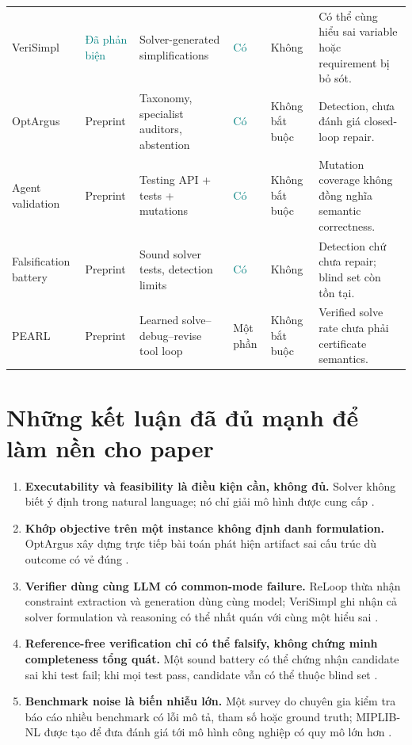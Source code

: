 \documentclass[11pt,a4paper]{article}
\newcommand{\yes}{\textcolor{teal}{Có}}
\newcommand{\partialyes}{\textcolor{gold!85!black}{Một phần}}
\newcommand{\preprint}{\textcolor{gold!80!black}{Preprint}}
\newcommand{\peer}{\textcolor{teal}{Đã phản biện}}
\begin{document}
\begin{longtable}{L{3.5cm} L{1.4cm} L{2.9cm} L{1.9cm} L{2.0cm} L{2.2cm}}
VeriSimpl \parencite{rahman2026verisimpl} & \peer & Solver-generated simplifications & \yes & Không & Có thể cùng hiểu sai variable hoặc requirement bị bỏ sót. \\
OptArgus \parencite{li2026optargus} & \preprint & Taxonomy, specialist auditors, abstention & \yes & Không bắt buộc & Detection, chưa đánh giá closed-loop repair. \\
Agent validation \parencite{zadorojniy2025validation} & \preprint & Testing API + tests + mutations & \yes & Không bắt buộc & Mutation coverage không đồng nghĩa semantic correctness. \\
Falsification battery \parencite{li2026falsification} & \preprint & Sound solver tests, detection limits & \yes & Không & Detection chứ chưa repair; blind set còn tồn tại. \\
PEARL \parencite{lu2026pearl} & \preprint & Learned solve--debug--revise tool loop & \partialyes & Không bắt buộc & Verified solve rate chưa phải certificate semantics. \\
\end{longtable}
\endgroup

\section{Những kết luận đã đủ mạnh để làm nền cho paper}

\begin{enumerate}
  \item \textbf{Executability và feasibility là điều kiện cần, không đủ.} Solver không biết ý định trong natural language; nó chỉ giải mô hình được cung cấp \parencite{lian2026reloop}.
  \item \textbf{Khớp objective trên một instance không định danh formulation.} OptArgus xây dựng trực tiếp bài toán phát hiện artifact sai cấu trúc dù outcome có vẻ đúng \parencite{li2026optargus}.
  \item \textbf{Verifier dùng cùng LLM có common-mode failure.} ReLoop thừa nhận constraint extraction và generation dùng cùng model; VeriSimpl ghi nhận cả solver formulation và reasoning có thể nhất quán với cùng một hiểu sai \parencite{lian2026reloop,rahman2026verisimpl}.
  \item \textbf{Reference-free verification chỉ có thể falsify, không chứng minh completeness tổng quát.} Một sound battery có thể chứng nhận candidate sai khi test fail; khi mọi test pass, candidate vẫn có thể thuộc blind set \parencite{li2026falsification}.
  \item \textbf{Benchmark noise là biến nhiễu lớn.} Một survey do chuyên gia kiểm tra báo cáo nhiều benchmark có lỗi mô tả, tham số hoặc ground truth; MIPLIB-NL được tạo để đưa đánh giá tới mô hình công nghiệp có quy mô lớn hơn \parencite{xiao2025survey,li2026miplibnl}.
\end{enumerate}
\end{document}
